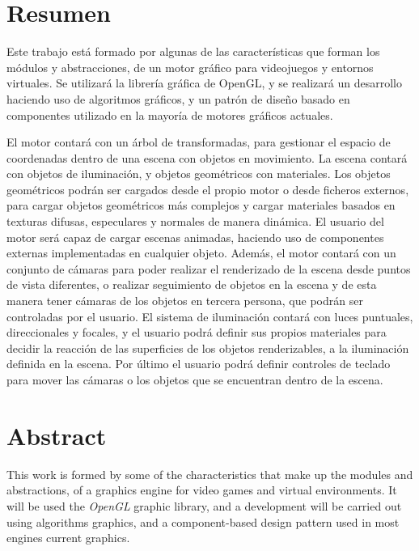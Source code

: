 \documentclass[a4paper]{book}
\begin{document}
\chapter*{Resumen}

Este trabajo está formado por algunas de las características que forman los módulos
y abstracciones, de un motor gráfico para videojuegos y entornos virtuales. Se utilizará
la librería gráfica de OpenGL, y se realizará un desarrollo haciendo uso de algoritmos
gráficos, y un patrón de diseño basado en componentes utilizado en la mayoría de motores
gráficos actuales.


El motor contará con un árbol de transformadas, para gestionar el espacio de coordenadas
dentro de una escena con objetos en movimiento. La escena contará con objetos de iluminación,
y objetos geométricos con materiales. Los objetos geométricos podrán ser cargados desde el
propio motor o desde ficheros externos, para cargar objetos geométricos más complejos y
cargar materiales basados en texturas difusas, especulares y normales de manera dinámica.
El usuario del motor será capaz de cargar escenas animadas, haciendo uso de componentes
externas implementadas en cualquier objeto. Además, el motor contará con un conjunto de
cámaras para poder realizar el renderizado de la escena desde puntos de vista diferentes,
o realizar seguimiento de objetos en la escena y de esta manera tener cámaras de los
objetos en tercera persona, que podrán ser controladas por el usuario. El sistema de
iluminación contará con luces puntuales, direccionales y focales, y el usuario podrá
definir sus propios materiales para decidir la reacción de las superficies de los
objetos renderizables, a la iluminación definida en la escena. Por último el usuario
podrá definir controles de teclado para mover las cámaras o los objetos que se encuentran
dentro de la escena.


\chapter*{Abstract}

This work is formed by some of the characteristics that make up the modules
and abstractions, of a graphics engine for video games and virtual environments. It will be used
the \textit{OpenGL} graphic library, and a development will be carried out using algorithms
graphics, and a component-based design pattern used in most engines current graphics.
\end{document}
